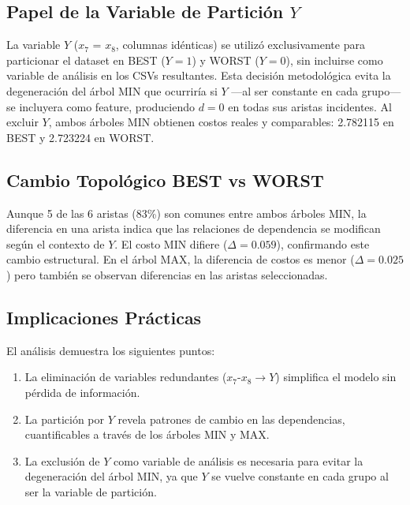\documentclass[12pt, a4paper]{article}
\begin{document}
\subsection{Papel de la Variable de Partición $Y$}

La variable $Y$ ($x_7$ = $x_8$, columnas idénticas) se utilizó exclusivamente
para particionar el dataset en BEST ($Y=1$) y WORST ($Y=0$), sin incluirse
como variable de análisis en los CSVs resultantes. Esta decisión
metodológica evita la degeneración del árbol MIN que ocurriría si $Y$
---al ser constante en cada grupo--- se incluyera como feature, produciendo
$d=0$ en todas sus aristas incidentes. Al excluir $Y$, ambos árboles MIN
obtienen costos reales y comparables: 2.782115 en BEST y 2.723224 en WORST.

\subsection{Cambio Topológico BEST vs WORST}

Aunque 5 de las 6 aristas (83\%) son comunes entre ambos árboles MIN,
la diferencia en una arista indica que las relaciones de dependencia se
modifican según el contexto de $Y$. El costo MIN difiere ($\Delta = 0.059$),
confirmando este cambio estructural. En el árbol MAX, la diferencia de
costos es menor ($\Delta = 0.025$) pero también se observan diferencias
en las aristas seleccionadas.

\subsection{Implicaciones Prácticas}

El análisis demuestra los siguientes puntos:

\begin{enumerate}
    \item La eliminación de variables redundantes ($x_7$-$x_8 \to Y$)
          simplifica el modelo sin pérdida de información.
    \item La partición por $Y$ revela patrones de cambio en las
          dependencias, cuantificables a través de los árboles MIN y MAX.
    \item La exclusión de $Y$ como variable de análisis es necesaria
          para evitar la degeneración del árbol MIN, ya que $Y$ se vuelve
          constante en cada grupo al ser la variable de partición.
\end{enumerate}

\end{document}
